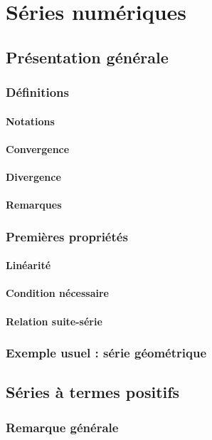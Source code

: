 \documentclass[12pt,a4paper,french]{book}
\begin{document}
\chapter{Séries numériques}
	\section{Présentation générale}
		\subsection{Définitions}
			\subsubsection{Notations}
			\subsubsection{Convergence}
			\subsubsection{Divergence}
			\subsubsection{Remarques}
		\subsection{Premières propriétés}
			\subsubsection{Linéarité}
			\subsubsection{Condition nécessaire}
			\subsubsection{Relation suite-série}
		\subsection{Exemple usuel : série géométrique}
	\section{Séries à termes positifs}
		\subsection{Remarque générale}
\end{document}
